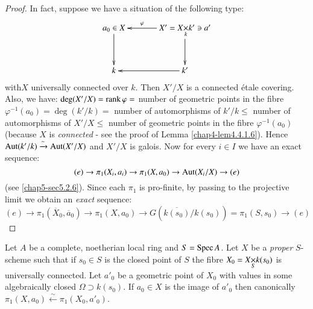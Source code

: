 \begin{proof}
In fact, suppose we have a situation of the following type:
\[
\xymatrix@=1.2cm{
a_{0}\in X\ar[d] & X'=\fprod{X}{k'\ni a'}{k}\ar[l]_-{\varphi}\ar[d]\\
k & k'\ar[l]
}
\] 
with\pageoriginale $X$ universally connected over $k$. Then $X'/X$ is
a connected 
\'etale covering. Also, we have: $\deg(X'/X)=\operatorname{rank} \varphi=$ number of
geometric points in the fibre $\varphi^{-1}(a_{0})=\deg (k'/k)=$
number of automorphisms of $k'/k\leq$ number of automorphisms of
$X'/X\leq$ number of geometric points in the fibre
$\varphi^{-1}(a_{0})$ (because $X$ is {\em connected} - see the proof
of Lemma \ref{chap4-lem4.4.1.6}). Hence
$\operatorname{Aut}(k'/k)\xrightarrow{\sim}\operatorname{Aut}(X'/X)$ and $X'/X$ is galois. Now for
every $i\in I$ we have an exact sequence:
$$
(e)\to \pi_{1}(X_{i},a_{i})\to \pi_{1}(X,a_{0})\to \operatorname{Aut} (X_{i}/X)\to (e)
$$
(see \ref{chap5-sec5.2.6}). Since each $\pi_{1}$ is pro-finite, by passing
to the projective limit we obtain an {\em exact} sequence:
$$
(e)\to \pi_{1}(\overline{X}_{0},\overline{a}_{0})\to
\pi_{1}(X,a_{0})\to
G(\overline{k(s_{0})}/k(s_{0}))=\pi_{1}(S,s_{0})\to (e)
$$
\end{proof}



\begin{prop}\label{chap8-prop8.1.3}
Let $A$ be a complete, noetherian local ring and $S=\operatorname{Spec} A$. Let $X$
be a {\em proper} $S$-scheme such that if $s_{0}\in S$ is the closed
point of $S$ the fibre $X_{0}=\fprod{X}{k(s_{0})}{S}$ is universally
connected. Let $a'_{0}$ be a geometric point of $X_{0}$ with values in
some algebraically closed $\Omega\supset k(s_{0})$. If $a_{0}\in X$ is
the image of $a'_{0}$ then canonically
$\pi_{1}(X,a_{0})\xleftarrow{\sim}\pi_{1}(X_{0},a'_{0})$. 
\end{prop}

